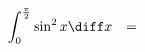 \begin{frame}
\begin{example}
$
\begin{array}{rcll|l}
\displaystyle \int_0^{\frac{\pi}{2}} \sin^2 x \diff x&=& \displaystyle

\end{array}
$

\end{example}
\end{frame}
